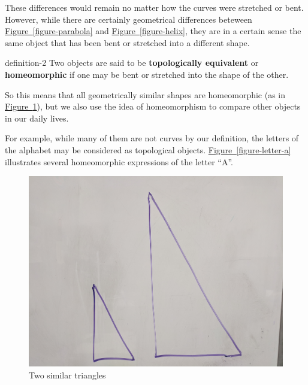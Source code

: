 \documentclass[10pt,]{article}
\newcommand{\terminology}[1]{\textbf{#1}}
\begin{document}
\hypertarget{p-9}{}%
These differences would remain no matter how the curves were stretched or bent. However, while there are certainly geometrical differences beteween \hyperref[figure-parabola]{Figure~\ref{figure-parabola}} and \hyperref[figure-helix]{Figure~\ref{figure-helix}}, they are in a certain sense the same object that has been bent or stretched into a different shape.%
\begin{definition}{}{definition-2}%
\hypertarget{p-10}{}%
Two objects are said to be \terminology{topologically equivalent} or \terminology{homeomorphic} if one may be bent or stretched into the shape of the other.%
\end{definition}
\hypertarget{p-11}{}%
So this means that all geometrically similar shapes are homeomorphic (as in \hyperref[figure-similar-triangles]{Figure~\ref{figure-similar-triangles}}), but we also use the idea of homeomorphism to compare other objects in our daily lives.%
\par
\hypertarget{p-12}{}%
For example, while many of them are not curves by our definition, the letters of the alphabet may be considered as topological objects. \hyperref[figure-letter-a]{Figure~\ref{figure-letter-a}} illustrates several homeomorphic expressions of the letter ``A''.%
\begin{figure}
\centering
\includegraphics[width=1\linewidth]{images/similar-triangles.jpg}
\caption{Two similar triangles\label{figure-similar-triangles}}
\end{figure}
\end{document}
